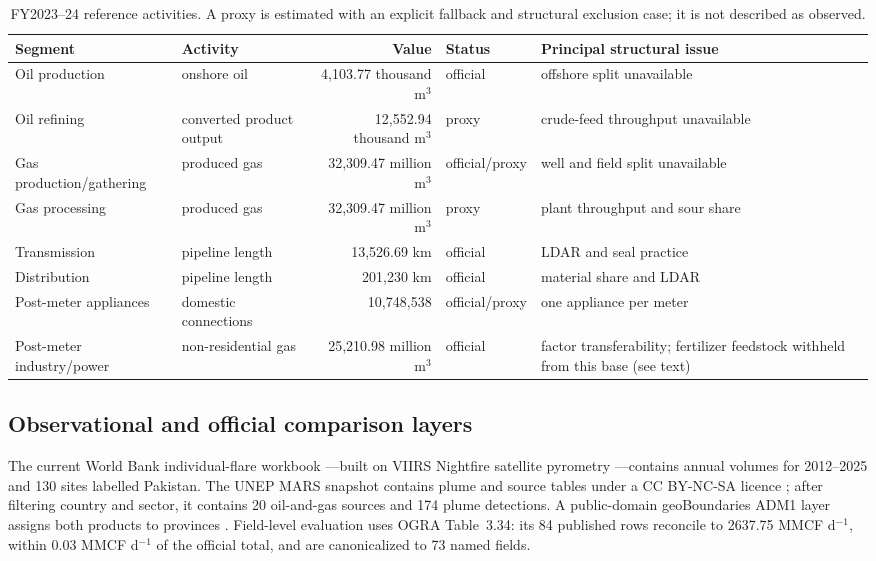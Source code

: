 \begin{table}[htbp]
\centering
\footnotesize
\begin{tabular}{@{}llrlp{6.0cm}@{}}
\toprule
\textbf{Segment} & \textbf{Activity} & \textbf{Value} & \textbf{Status} & \textbf{Principal structural issue} \\
\midrule
Oil production & onshore oil & 4,103.77 thousand m$^3$ & official & offshore split unavailable \\
Oil refining & converted product output & 12,552.94 thousand m$^3$ & proxy & crude-feed throughput unavailable \\
Gas production/gathering & produced gas & 32,309.47 million m$^3$ & official/proxy & well and field split unavailable \\
Gas processing & produced gas & 32,309.47 million m$^3$ & proxy & plant throughput and sour share \\
Transmission & pipeline length & 13,526.69 km & official & LDAR and seal practice \\
Distribution & pipeline length & 201,230 km & official & material share and LDAR \\
Post-meter appliances & domestic connections & 10,748,538 & official/proxy & one appliance per meter \\
Post-meter industry/power & non-residential gas & 25,210.98 million m$^3$ & official & factor transferability; fertilizer feedstock withheld from this base (see text) \\
\bottomrule
\end{tabular}
\caption{FY2023--24 reference activities. A proxy is estimated with an explicit fallback and
structural exclusion case; it is not described as observed.}
\label{tab:activity}
\end{table}

\subsection{Observational and official comparison layers}

The current World Bank individual-flare workbook \citep{worldbankflaring2026}---built on
VIIRS Nightfire satellite pyrometry \citep{viirsnightfire}---contains annual volumes for
2012--2025 and \num{130} sites labelled Pakistan. The UNEP MARS snapshot contains plume and source tables under
a CC BY-NC-SA licence \citep{unepmars2026}; after filtering country and sector, it contains
\num{20} oil-and-gas sources and \num{174} plume detections. A public-domain geoBoundaries ADM1
layer assigns both products to provinces \citep{runfola2020}. Field-level evaluation uses
OGRA Table~3.34: its 84 published rows reconcile to \num{2637.75} MMCF d$^{-1}$, within
\num{0.03} MMCF d$^{-1}$ of the official total, and are canonicalized to 73 named fields.

